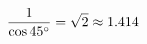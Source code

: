 \documentclass[preview]{standalone}
\begin{document}
\begin{align*}
\special{dvisvgm:raw <g id='unique000'>}\frac{1}{\cos 45^\circ} = \sqrt{2} \approx 1.414\special{dvisvgm:raw </g>}
\end{align*}
\end{document}
